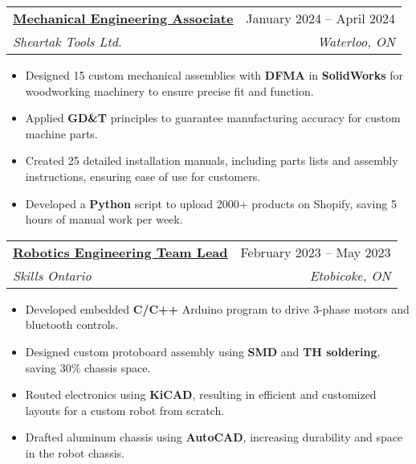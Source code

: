 \documentclass[letterpaper]{article}
\makeatletter
\newcommand{\resumeItem}[1]{
  \item\small{
    {#1 \vspace{-2pt}}
  }
}
\newcommand{\resumeSubheading}[4]{
  \vspace{-2pt}\item
    \begin{tabular*}{0.97\textwidth}[t]{l@{\extracolsep{\fill}}r}
      \textbf{#1} & #2 \\
      \textit{\small#3} & \textit{\small #4} \\
    \end{tabular*}\vspace{-7pt}
}
\newcommand{\resumeItemListStart}{\begin{itemize}}
\newcommand{\resumeItemListEnd}{\end{itemize}\vspace{-5pt}}
\makeatother
\begin{document}

\resumeSubheading
{\href{https://www.gavintranquilino.com/sheartak.html}{\underline{Mechanical Engineering Associate}}}{January 2024 -- April 2024}
{Sheartak Tools Ltd.}{Waterloo, ON}
\resumeItemListStart
\resumeItem{Designed 15 custom mechanical assemblies with \textbf{DFMA} in \textbf{SolidWorks} for woodworking machinery to ensure precise fit and function.}
\resumeItem{Applied \textbf{GD\&T} principles to guarantee manufacturing accuracy for custom machine parts.}
\resumeItem{Created 25 detailed installation manuals, including parts lists and assembly instructions, ensuring ease of use for customers.}
\resumeItem{Developed a \textbf{Python} script to upload 2000+ products on Shopify, saving 5 hours of manual work per week.}
\resumeItemListEnd


\resumeSubheading
{\href{https://www.gavintranquilino.com/hockey-robot.html}{\underline{Robotics Engineering Team Lead}}}{February 2023 -- May 2023}
{Skills Ontario}{Etobicoke, ON}
\resumeItemListStart
\resumeItem{Developed embedded \textbf{C/C++} Arduino program to drive 3-phase motors and bluetooth controls.}
\resumeItem{Designed custom protoboard assembly using \textbf{SMD} and \textbf{TH soldering}, saving 30\% chassis space.}
\resumeItem{Routed electronics using \textbf{KiCAD}, resulting in efficient and customized layouts for a custom robot from scratch.}
\resumeItem{Drafted aluminum chassis using \textbf{AutoCAD}, increasing durability and space in the robot chassis.}
\resumeItemListEnd
\end{document}
